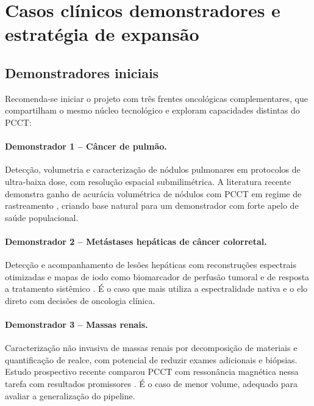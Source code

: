 \documentclass[11pt,a4paper]{article}
\begin{document}
\section{Casos clínicos demonstradores e estratégia de expansão}

\subsection{Demonstradores iniciais}

Recomenda-se iniciar o projeto com três frentes oncológicas complementares, que compartilham o mesmo núcleo tecnológico e exploram capacidades distintas do PCCT:

\paragraph{Demonstrador 1 -- Câncer de pulmão.} Detecção, volumetria e caracterização de nódulos pulmonares em protocolos de ultra-baixa dose, com resolução espacial submilimétrica. A literatura recente demonstra ganho de acurácia volumétrica de nódulos com PCCT em regime de rastreamento \cite{lungvol}, criando base natural para um demonstrador com forte apelo de saúde populacional.

\paragraph{Demonstrador 2 -- Metástases hepáticas de câncer colorretal.} Detecção e acompanhamento de lesões hepáticas com reconstruções espectrais otimizadas e mapas de iodo como biomarcador de perfusão tumoral e de resposta a tratamento sistêmico \cite{crlm,liveriodine}. É o caso que mais utiliza a espectralidade nativa e o elo direto com decisões de oncologia clínica.

\paragraph{Demonstrador 3 -- Massas renais.} Caracterização não invasiva de massas renais por decomposição de materiais e quantificação de realce, com potencial de reduzir exames adicionais e biópsias. Estudo prospectivo recente comparou PCCT com ressonância magnética nessa tarefa com resultados promissores \cite{renal}. É o caso de menor volume, adequado para avaliar a generalização do pipeline.
\end{document}
